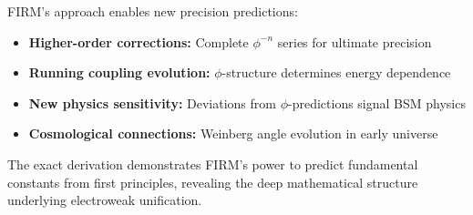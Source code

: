 FIRM's approach enables new precision predictions:

\begin{itemize}
\item \textbf{Higher-order corrections:} Complete $\phi^{-n}$ series for ultimate precision
\item \textbf{Running coupling evolution:} $\phi$-structure determines energy dependence  
\item \textbf{New physics sensitivity:} Deviations from $\phi$-predictions signal BSM physics
\item \textbf{Cosmological connections:} Weinberg angle evolution in early universe
\end{itemize}

The exact derivation demonstrates FIRM's power to predict fundamental constants from first principles, revealing the deep mathematical structure underlying electroweak unification.
